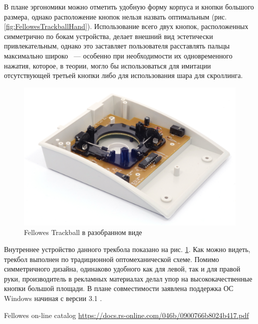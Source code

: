 \documentclass[11pt, a4paper]{article}
\begin{document}
В плане эргономики можно отметить удобную форму корпуса и кнопки большого размера, однако расположение кнопок нельзя назвать оптимальным (рис. \ref{fig:FellowesTrackballHand}). Использование всего двух кнопок, расположенных симметрично по бокам устройства, делает внешний вид эстетически привлекательным, однако это заставляет пользователя расставлять пальцы максимально широко ~--- особенно при необходимости их одновременного нажатия, которое, в теории, могло бы использоваться для имитации отсутствующей третьей кнопки либо для использования шара для скроллинга.

\begin{figure}[h]
    \centering
    \includegraphics[scale=0.7]{1995_fellowes_trackball/inside_60.jpg}
    \caption{Fellowes Trackball в разобранном виде}
    \label{fig:FellowesTrackballInside}
\end{figure}

Внутреннее устройство данного трекбола показано на рис. \ref{fig:FellowesTrackballInside}. Как можно видеть,  трекбол выполнен по традиционной оптомеханической схеме. Помимо симметричного дизайна, одинаково удобного как для левой, так и для правой руки, производитель в рекламных материалах делал упор на высококачественные кнопки большой площади. В плане совместимости заявлена поддержка ОС Windows начиная с версии 3.1 \cite{advertising}.

\begin{thebibliography}{9}
 Fellowes on-line catalog \url{https://docs.rs-online.com/046b/0900766b8024b417.pdf}
\end{thebibliography}
\end{document}
